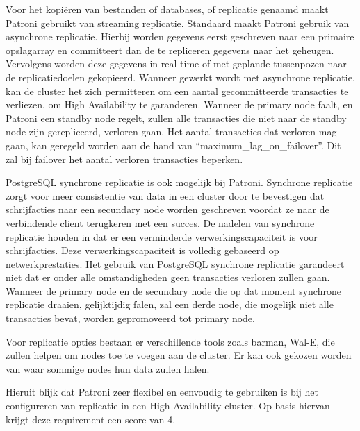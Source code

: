 Voor het kopiëren van bestanden of databases, of replicatie genaamd maakt Patroni gebruikt van streaming replicatie. Standaard maakt Patroni gebruik van asynchrone replicatie. Hierbij worden gegevens eerst geschreven naar een primaire opslagarray en committeert dan de te repliceren gegevens naar het geheugen. Vervolgens worden deze gegevens in real-time of met geplande tussenpozen naar de replicatiedoelen gekopieerd.
Wanneer gewerkt wordt met asynchrone replicatie, kan de cluster het zich permitteren om een aantal gecommitteerde transacties te verliezen, om High Availability te garanderen. Wanneer de primary node faalt, en Patroni een standby node regelt, zullen alle transacties die niet naar de standby node zijn gerepliceerd, verloren gaan. Het aantal transacties dat verloren mag gaan, kan geregeld worden aan de hand van “maximum\_lag\_on\_failover”. Dit zal bij failover het aantal verloren transacties beperken.

PostgreSQL synchrone replicatie is ook mogelijk bij Patroni. Synchrone replicatie zorgt voor meer consistentie van data in een cluster door te bevestigen dat schrijfacties naar een secundary node worden geschreven voordat ze naar de verbindende client terugkeren met een succes. De nadelen van synchrone replicatie houden in dat er een verminderde verwerkingscapaciteit is voor schrijfacties. Deze verwerkingscapaciteit is volledig gebaseerd op netwerkprestaties. Het gebruik van PostgreSQL synchrone replicatie garandeert niet dat er onder alle omstandigheden geen transacties verloren zullen gaan. Wanneer de primary node en de secundary node die op dat moment synchrone replicatie draaien, gelijktijdig falen, zal een derde node, die mogelijk niet alle transacties bevat, worden gepromoveerd tot primary node.

Voor replicatie opties bestaan er verschillende tools zoals barman, Wal-E, die zullen helpen om nodes toe te voegen aan de cluster. Er kan ook gekozen worden van waar sommige nodes hun data zullen halen.

Hieruit blijk dat Patroni zeer flexibel en eenvoudig te gebruiken is bij het configureren van replicatie in een High Availability cluster. Op basis hiervan krijgt deze requirement een score van 4.

\subsubsection{}
\label{subsubsec:Failover}

